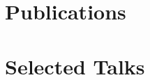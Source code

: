 \documentclass[]{scoggins-cv} %
\begin{document}
    \section{Publications}
    \begin{list}{}{\pubslist}
        
    \end{list}
    \vspace{1em}
\fi


\vspace{-0.5cm}

\ifdefined \withtalks

    \section{Selected Talks}
    \vspace{-0.3cm}

    \begin{list}{}{\pubslist}
        
    \end{list}
\fi
\end{document}
